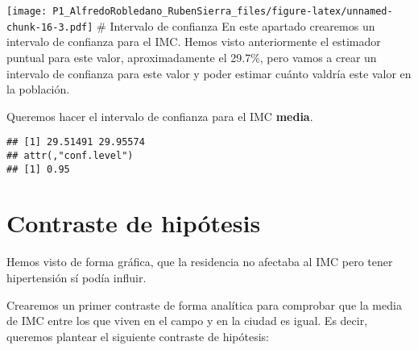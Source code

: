 \documentclass[
]{article}
\newenvironment{Shaded}{\begin{snugshade}}{\end{snugshade}}
\newcommand{\AttributeTok}[1]{\textcolor[rgb]{0.77,0.63,0.00}{#1}}
\newcommand{\CommentTok}[1]{\textcolor[rgb]{0.56,0.35,0.01}{\textit{#1}}}
\newcommand{\ConstantTok}[1]{\textcolor[rgb]{0.00,0.00,0.00}{#1}}
\newcommand{\FloatTok}[1]{\textcolor[rgb]{0.00,0.00,0.81}{#1}}
\newcommand{\FunctionTok}[1]{\textcolor[rgb]{0.00,0.00,0.00}{#1}}
\newcommand{\NormalTok}[1]{#1}
\newcommand{\OtherTok}[1]{\textcolor[rgb]{0.56,0.35,0.01}{#1}}
\newcommand{\SpecialCharTok}[1]{\textcolor[rgb]{0.00,0.00,0.00}{#1}}
\newcommand{\StringTok}[1]{\textcolor[rgb]{0.31,0.60,0.02}{#1}}
\begin{document}
\texttt{[image: P1\_AlfredoRobledano\_RubenSierra\_files/figure-latex/unnamed-chunk-16-3.pdf]}
\# Intervalo de confianza En este apartado crearemos un intervalo de
confianza para el IMC. Hemos visto anteriormente el estimador puntual
para este valor, aproximadamente el 29.7\%, pero vamos a crear un
intervalo de confianza para este valor y poder estimar cuánto valdría
este valor en la población.

Queremos hacer el intervalo de confianza para el IMC \textbf{media}.

\begin{Shaded}
\end{Shaded}

\begin{verbatim}
## [1] 29.51491 29.95574
## attr(,"conf.level")
## [1] 0.95
\end{verbatim}

\hypertarget{contraste-de-hipuxf3tesis}{%
\section{Contraste de hipótesis}\label{contraste-de-hipuxf3tesis}}

Hemos visto de forma gráfica, que la residencia no afectaba al IMC pero
tener hipertensión sí podía influir.

Crearemos un primer contraste de forma analítica para comprobar que la
media de IMC entre los que viven en el campo y en la ciudad es igual. Es
decir, queremos plantear el siguiente contraste de hipótesis:
\end{document}
